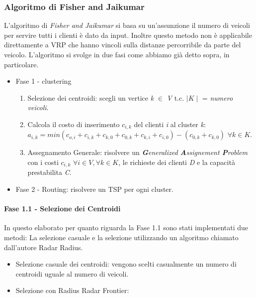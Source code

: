\documentclass[]{article}
\begin{document}
\subsubsection{Algoritmo di Fisher and Jaikumar} \label{FJ-Sec}
L'algoritmo di \emph{Fisher and Jaikumar} si basa su un'assunzione il numero di veicoli per servire tutti i clienti è dato da input.
Inoltre questo metodo non è applicabile direttamente a VRP che hanno vincoli sulla distanze percorribile da parte del veicolo.
L'algoritmo si svolge in due fasi come abbiamo già detto sopra, in particolare.
\begin{itemize}
 \item Fase 1 - clustering
 	\begin{enumerate}
		\item Selezione dei centroidi: scegli un vertice \emph{k} $\in$ \emph{V} t.c. $\mid K \mid$ = \emph{numero veicoli}.
		\item Calcola il costo di inserimento $c_{i,k}$ del clienti \emph{i} al cluster \emph{k}: \\
		$a_{i,k} = min(c_{o,i} + c_{i,k}+ c_{k,0} + c_{0,k} + c_{k,i} + c_{i,0}) - (c_{0,k} + c_{k,0})  $ $ \forall k \in K$.
		\item Assegnamento Generale: risolvere un \emph{\textbf{G}eneralized \textbf{A}ssignement \textbf{P}roblem} con i costi $c_{i,k} $ $ \forall i \in V , \forall k \in K$, le richieste dei clienti \emph{D} e la capacità prestabilita \emph{C}.
 	\end{enumerate}
 \item Fase 2 - Routing: risolvere un TSP per ogni cluster.
 
\end{itemize}
	
\paragraph{Fase 1.1 - Selezione dei Centroidi} \hfill

In questo elaborato per quanto riguarda la Fase 1.1 sono stati implementati due metodi: La selezione casuale e la selezione utilizzando un algoritmo chiamato dall'autore Radar Radius.

\begin{itemize}
	\item Selezione casuale dei centroidi: vengono scelti casualmente un numero di centroidi uguale al numero di veicoli.
	\item Selezione con Radius Radar Frontier:
\end{itemize}  
\end{document}
